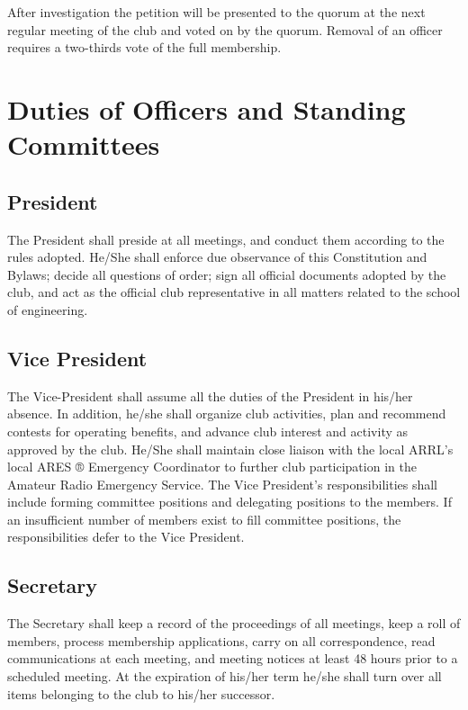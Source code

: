 \documentclass{article}
\begin{document}
\noindent After investigation the petition will be presented to the quorum at the next regular meeting of the club and voted on by the quorum. Removal of an officer requires a two-thirds vote of the full membership.

\section{Duties of Officers and Standing Committees}
\subsection{President}

The President shall preside at all meetings, and conduct them according to the rules adopted. He/She shall enforce due observance of this Constitution and Bylaws; decide all questions of order; sign all official documents adopted by the club, and act as the official club representative in all matters related to the school of engineering. 

\subsection{Vice President}

The Vice-President shall assume all the duties of the President in his/her absence. In addition, he/she shall organize club activities, plan and recommend contests for operating benefits, and advance club interest and activity as approved by the club. He/She shall maintain close liaison with the local ARRL's local ARES ® Emergency Coordinator to further club participation in the Amateur Radio Emergency Service. The Vice President's responsibilities shall include forming committee positions and delegating positions to the members. If an insufficient number of members exist to fill committee positions, the responsibilities defer to the Vice President. 

\subsection{Secretary}

The Secretary shall keep a record of the proceedings of all meetings, keep a roll of members,  process membership applications, carry on all correspondence, read communications at each meeting, and meeting notices at least 48 hours prior to a scheduled meeting. At the expiration of his/her term he/she shall turn over all items belonging to the club to his/her successor.
\end{document}
